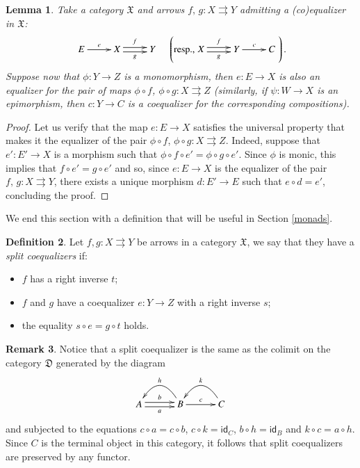 \documentclass[12pt]{article}
\newtheorem{lemma}{Lemma}[section]
\theoremstyle{definition}
\newtheorem{definition}[lemma]{Definition}
\newtheorem{remark}[lemma]{Remark}
\def\D{\mathfrak D}
\def\X{\mathfrak X}
\numberwithin{equation}{section}
\newcommand{\id}[1]{\mathsf{id}_{#1}}
\begin{document}
\begin{lemma}\label{easy_lemma_monos_and_eq}
Take a category $\X$ and  arrows $f,\, g\colon X\rightrightarrows Y$  admitting a (co)equalizer in $\X$:
\[
\xymatrix{E\ar[r]^e&X\ar@<-.5ex>[r]_g \ar@<.5ex>[r]^f&Y}\quad \left(\text{resp.,} \xymatrix{X\ar@<-.5ex>[r]_g \ar@<.5ex>[r]^f&Y\ar[r]^c&C}\right).\]
Suppose now that $\phi\colon Y\to Z$ is a monomorphism, then $e\colon E\to X$ is also an equalizer for the pair of maps $\phi\circ f$, $\phi\circ g\colon X\rightrightarrows Z$ (similarly, if $\psi\colon W\to X$ is an epimorphism, then $c\colon Y\to C$ is a coequalizer for the corresponding compositions).
\end{lemma}
\begin{proof}
Let us verify that the map $e\colon E\to X$ satisfies the universal property that makes it the equalizer of the pair $\phi\circ f$, $\phi\circ g\colon X\rightrightarrows Z$. Indeed, suppose that $e'\colon E'\to X$ is a morphism such that $\phi\circ f\circ e'=\phi\circ g\circ e'$. Since $\phi$ is monic, this implies that $f\circ e'=g\circ e'$ and so, since $e\colon E\to X$ is the equalizer of the pair $f,\, g\colon X\rightrightarrows Y$, there exists a unique morphism $d\colon E'\to E$ such that $e\circ d=e'$, concluding the proof.
\end{proof}
We end this section with a definition that will be useful in Section \ref{monads}.
\begin{definition}Let $f,g: X\rightrightarrows Y$ be arrows in a category $\X$, we say that they have a \emph{split coequalizers} if:
	\begin{itemize}
		\item  $f$ has a right inverse $t$;
		\item $f$ and $g$ have a coequalizer $e:Y\rightarrow Z$ with a right inverse $s$;
		\item the equality $s\circ e=g\circ t$ holds.
	\end{itemize}
\end{definition}

\begin{remark}\label{split}Notice that a split coequalizer is the same as the colimit on the category $\D$ generated by the diagram
	\[
	\xymatrix@C=30pt{
		A\ar@<-.5ex>[r]_{a}\ar@<.5ex>[r]^{b}&B\ar[r]^{c} \ar@/_.7cm/[l]_{h}&C\ar@/_0.7cm/[l]_{k} 
	}
	\]
	and subjected to the equations $c\circ a=c\circ b$, $c\circ k=\id{C}$, $b\circ h=\id{B}$ and $k\circ c=a\circ h$.
 Since $C$ is the terminal object in this category, it follows that split coequalizers are preserved by any functor.
\end{remark}
\end{document}
